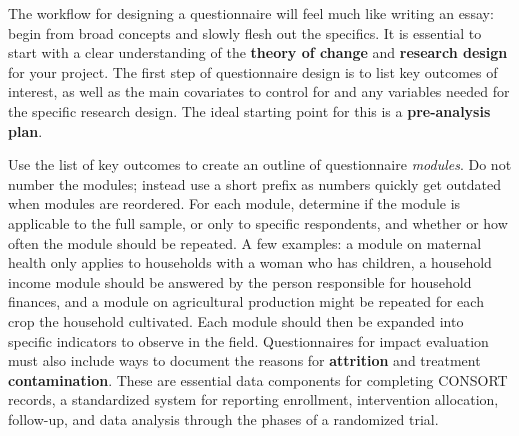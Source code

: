 The workflow for designing a questionnaire will feel much like writing an essay:
begin from broad concepts and slowly flesh out the specifics.
It is essential to start with a clear understanding of the
\textbf{theory of change}
and \textbf{research design}
  for your project.
The first step of questionnaire design is to list key outcomes of interest,
as well as the main covariates to control for and any variables needed for the specific research design.
The ideal starting point for this is a \textbf{pre-analysis plan}.

Use the list of key outcomes to create an outline of questionnaire \textit{modules}.
Do not number the modules; instead use a short prefix
as numbers quickly get outdated when modules are reordered.
For each module, determine if the module is applicable to the full sample,
or only to specific respondents,
and whether or how often the module should be repeated.
A few examples:
a module on maternal health only applies
to households with a woman who has children,
a household income module should be answered
by the person responsible for household finances,
and a module on agricultural production
might be repeated for each crop the household cultivated.
Each module should then be expanded
into specific indicators to observe in the field.
Questionnaires for impact evaluation
must also include ways to document the reasons for \textbf{attrition} and
treatment \textbf{contamination}.
These are essential data components for completing CONSORT records,
a standardized system for reporting enrollment, intervention allocation, follow-up,
and data analysis through the phases of a randomized trial.


